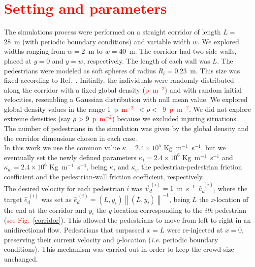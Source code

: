 \documentclass[preprint,12pt]{elsarticle}
\begin{document}
\section{\label{simulations}\textcolor{red}{Setting and parameters}}

The simulations process were performed on a straight corridor of length $L=$ 
28~m (with periodic boundary conditions) and variable width $w$. We explored 
widths ranging from $w=2$~m to $w=40$~m. The corridor had two side walls, placed 
at $y=0$ and $y=w$, respectively. The length of each wall was $L$. The 
pedestrians were modeled as soft spheres of radius $R_i=0.23$~m. This size was 
fixed according to Ref.~\cite{metric_handbook}. Initially, the individuals were 
randomly distributed along the corridor with a fixed global density 
(\textcolor{red}{p~m$^{-2}$}) and with random initial velocities, resembling a 
Gaussian distribution with null mean value. We explored global density values in 
the range 1~\textcolor{red}{p~m$^{-2}$}~$<\rho<$~9~\textcolor{red}{p~m$^{-2}$}. 
We did not explore extreme densities (say $\rho>$9~\textcolor{red}{p~m$^{-2}$}) 
because we excluded injuring situations. The number of pedestrians in the 
simulation was given by the global density and the corridor dimensions chosen in 
each case. \\

In this work we use the common value $\kappa=2.4 \times 
10^{5}$ Kg~m$^{-1}$~s$^{-1}$, but we eventually set the newly defined 
parameters $\kappa_i=2.4 \times 10^{6}$ Kg~m$^{-1}$~s$^{-1}$  and $\kappa_w=2.4 
\times 10^{6}$ Kg~m$^{-1}$~s$^{-1}$, being $\kappa_i$ and $\kappa_w$ the 
pedestrian-pedestrian friction coefficient and the pedestrian-wall friction 
coefficient, respectively. \\

The desired velocity for each pedestrian $i$ was 
$\vec{v}_d^{~(i)}=1$~m~s$^{-1}$~$\hat{e}_d^{~(i)}$, where the target $\hat{e}_d^{~(i)}$ 
was set as $\hat{e}_d^{~(i)}=(L,y_i)\left \| (L,y_i) \right \|^{-1}$, being $L$ 
the \textit{x}-location of the end at the corridor and $y_i$ the 
\textit{y}-location corresponding to the \textit{ith} pedestrian 
(\textcolor{red}{see Fig.~\ref{corridor}}). This allowed the pedestrians to 
move from left to right in an unidirectional flow. Pedestrians that surpassed 
$x=L$ were re-injected at $x=0$, preserving their current velocity and 
\textit{y}-location (\textit{i.e.} periodic boundary conditions). This mechanism 
was carried out in order to keep
the crowd size unchanged.\\
\end{document}
